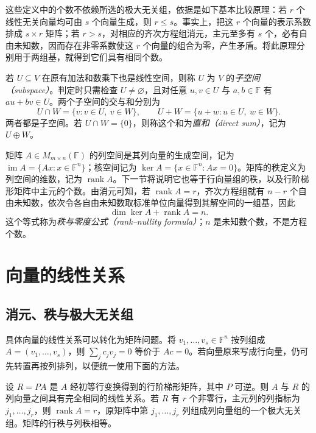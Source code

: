 这些定义中的个数不依赖所选的极大无关组，依据是如下基本比较原理：若 $r$ 个线性无关向量均可由 $s$ 个向量生成，则 $r\le s$。事实上，把这 $r$ 个向量的表示系数排成 $s\times r$ 矩阵；若 $r>s$，对相应的齐次方程组消元，主元至多有 $s$ 个，必有自由未知数，因而存在非零系数使这 $r$ 个向量的组合为零，产生矛盾。将此原理分别用于两组基，就得到它们具有相同个数。

\begin{definition}
\label{def:laex-subspace}
若 $U\subseteq V$ 在原有加法和数乘下也是线性空间，则称 $U$ 为 $V$ 的\emph{子空间（subspace）}。判定时只需检查 $U\ne\varnothing$，且对任意 $u,v\in U$ 与 $a,b\in\mathbb F$ 有 $au+bv\in U$。两个子空间的交与和分别为
\[
U\cap W=\{v:v\in U,\ v\in W\},\qquad
U+W=\{u+w:u\in U,\ w\in W\}.
\]
两者都是子空间。若 $U\cap W=\{0\}$，则称这个和为\emph{直和（direct sum）}，记为 $U\oplus W$。
\end{definition}

矩阵 $A\in M_{m\times n}(\mathbb F)$ 的列空间是其列向量的生成空间，记为 $\operatorname{im}A=\{Ax:x\in\mathbb F^n\}$；核空间记为 $\ker A=\{x\in\mathbb F^n:Ax=0\}$。矩阵的秩定义为列空间的维数，记为 $\operatorname{rank}A$。下一节将说明它也等于行向量组的秩，以及行阶梯形矩阵中主元的个数。由消元可知，若 $\operatorname{rank}A=r$，齐次方程组就有 $n-r$ 个自由未知数，依次令各自由未知数取标准单位向量得到其解空间的一组基，因此
\begin{equation}
\label{eq:laex-rank-nullity}
\dim\ker A+\operatorname{rank}A=n.
\end{equation}
这个等式称为\emph{秩与零度公式（rank--nullity formula）}；$n$ 是未知数个数，不是方程个数。

\section{向量的线性关系}
\label{sec:laex-linear-relations}

\subsection{消元、秩与极大无关组}

具体向量的线性关系可以转化为矩阵问题。将 $v_1,\ldots,v_s\in\mathbb F^n$ 按列组成 $A=(v_1,\ldots,v_s)$，则 $\sum_j c_jv_j=0$ 等价于 $Ac=0$。若向量原来写成行向量，仍可先转置再按列排列，以便统一使用下面的方法。

\begin{proposition}
\label{prop:laex-pivot-columns}
设 $R=PA$ 是 $A$ 经初等行变换得到的行阶梯形矩阵，其中 $P$ 可逆。则 $A$ 与 $R$ 的列向量之间具有完全相同的线性关系。若 $R$ 有 $r$ 个非零行，主元列的列指标为 $j_1,\ldots,j_r$，则 $\operatorname{rank}A=r$，原矩阵中第 $j_1,\ldots,j_r$ 列组成列向量组的一个极大无关组。矩阵的行秩与列秩相等。
\end{proposition}

